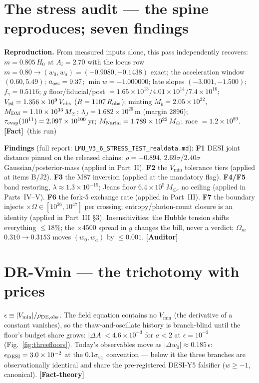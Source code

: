 \documentclass[11pt]{article}
\newcommand{\Auditor}{\textbf{\textcolor{teal!55!black}{[Auditor]}}}
\newcommand{\fact}{\textcolor{green!40!black}{\textbf{[Fact]}}}
\newcommand{\factth}{\textcolor{green!40!black}{\textbf{[Fact-theory]}}}
\newcommand{\msun}{M_\odot}
\begin{document}
\section{The stress audit --- the spine reproduces; seven findings}
\textbf{Reproduction.} From measured inputs alone, this pass independently recovers: $m=0.805\,H_0$ at $A_i=2.70$ with the locus row $m=0.80\to(w_0,w_a)=(-0.9080,-0.1438)$ exact; the acceleration window $(0.60,5.49)$; $a_{\rm osc}=9.37$; $\min w=-1.000000$; late slopes $(-3.001,-1.500)$; $f_\gamma=0.5116$; $g$ floor/fiducial/post $=1.65\times10^{13}/4.01\times10^{14}/7.4\times10^{16}$; $V_{\rm isl}=1.356\times10^{9}\,V_{\rm obs}$ ($R=1107\,R_{\rm obs}$); minting $M_b=2.05\times10^{32}$, $M_{\rm DM}=1.10\times10^{33}\,\msun$; $\lambda_J=1.682\times10^{26}$\,m (margin 2896); $\tau_{\rm evap}(10^{11})=2.097\times10^{100}$\,yr; $M_{\rm Nariai}=1.789\times10^{22}\,\msun$; race $=1.2\times10^{89}$. \fact\ (this run)

\textbf{Findings} (full report: \texttt{LMU\_V3\_6\_STRESS\_TEST\_realdata.md}): \textbf{F1} DESI joint distance pinned on the released chains: $\rho=-0.894$, $2.69\sigma$/$2.40\sigma$ Gaussian/posterior-mass (applied in Part~II). \textbf{F2} the $V_{\min}$ tolerance tiers (applied at items B/J2). \textbf{F3} the M87 inversion (applied at the mandatory flag). \textbf{F4/F5} band restoring, $\lambda\approx1.3\times10^{-15}$; Jeans floor $6.4\times10^{5}\,\msun$, no ceiling (applied in Parts~IV--V). \textbf{F6} the fork-5 exchange rate (applied in Part~III). \textbf{F7} the boundary injects $\times\Omega\in[10^{26},10^{47}]$ per crossing; entropy/photon-count closure is an identity (applied in Part~III \S3). Insensitivities: the Hubble tension shifts everything $\le18\%$; the $\times4500$ spread in $g$ changes the bill, never a verdict; $\Omega_m$ $0.310\!\to\!0.3153$ moves $(w_0,w_a)$ by $\le0.001$. \Auditor

\section{DR-Vmin --- the trichotomy with prices}
$\epsilon\equiv|V_{\min}|/\rho_{\rm DE,obs}$. The field equation contains no $V_{\min}$ (the derivative of a constant vanishes), so the thaw-and-oscillate history is branch-blind until the floor's budget share grows: $|\Delta A|<4.6\times10^{-3}$ for $a<2$ at $\epsilon=10^{-2}$ (Fig.~\ref{fig:threefloors}). Today's observables move as $|\Delta w_0|\approx0.185\,\epsilon$: \textbf{$\epsilon_{\rm DESI}=3.0\times10^{-2}$} at the $0.1\sigma_{w_0}$ convention --- below it the three branches are observationally identical and share the pre-registered DESI-Y5 falsifier ($w\ge-1$, canonical). \factth
\end{document}
